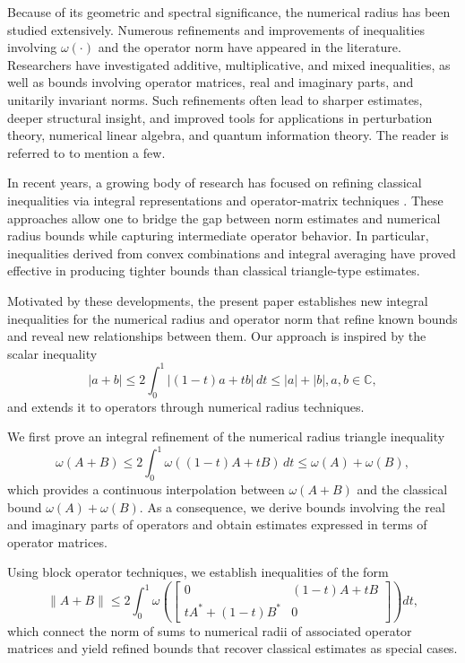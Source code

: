 \documentclass[12pt,twoside,reqno]{amsart}
\numberwithin{equation}{section}
\begin{document}
Because of its geometric and spectral significance, the numerical radius has been studied extensively. Numerous refinements and improvements of inequalities involving $\omega(\cdot)$ and the operator norm have appeared in the literature. Researchers have investigated additive, multiplicative, and mixed inequalities, as well as bounds involving operator matrices, real and imaginary parts, and unitarily invariant norms. Such refinements often lead to sharper estimates, deeper structural insight, and improved tools for applications in perturbation theory, numerical linear algebra, and quantum information theory. The reader is referred to \cite {Abu-Omar_Rocky_2015,Abu-Omar_LAA_2015,Hirzallah_IEOT_2011,Hirzallah_MathScandin_2014,Hirzallah_NFAO_2011,Kittaneh_Studia_2003,Kittaneh_Studia_2005,Kittaneh_LAA_2015,Moradi_LAMA_2021,Moslehian_MathScand_2017,Sababheh_LAMA_2021,Sattari_LAA_2015} to mention a few.

In recent years, a growing body of research has focused on refining classical inequalities via integral representations and operator-matrix techniques \cite{Moradi_LAMA_2021, Sababheh_LAMA_2021}. These approaches allow one to bridge the gap between norm estimates and numerical radius bounds while capturing intermediate operator behavior. In particular, inequalities derived from convex combinations and integral averaging have proved effective in producing tighter bounds than classical triangle-type estimates.

Motivated by these developments, the present paper establishes new integral inequalities for the numerical radius and operator norm that refine known bounds and reveal new relationships between them. Our approach is inspired by the scalar inequality \cite[Theorem 2.1]{1}
\begin{equation}\label{1}
|a+b|\le 2\int_0^1 |(1-t)a+tb|\,dt \le |a|+|b|, a,b\in \mathbb{C},
\end{equation}
and extends it to operators through numerical radius techniques.

We first prove an integral refinement of the numerical radius triangle inequality
\[
\omega(A+B)\le 2\int_0^1 \omega((1-t)A+tB)\,dt \le \omega(A)+\omega(B),
\]
which provides a continuous interpolation between $\omega(A+B)$ and the classical bound $\omega(A)+\omega(B)$. As a consequence, we derive bounds involving the real and imaginary parts of operators and obtain estimates expressed in terms of operator matrices.

Using block operator techniques, we establish inequalities of the form
\[
\|A+B\|\le 2\int_0^1
\omega\!\left(
\begin{bmatrix}
0 & (1-t)A+tB\\
tA^*+(1-t)B^* & 0
\end{bmatrix}
\right)dt,
\]
which connect the norm of sums to numerical radii of associated operator matrices and yield refined bounds that recover classical estimates as special cases.
\end{document}
